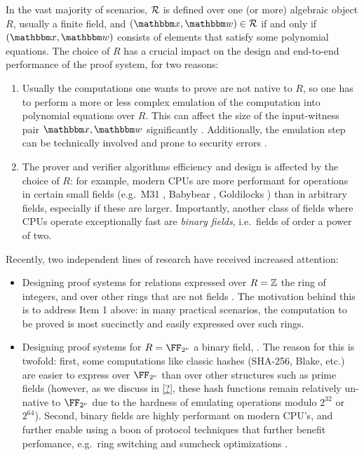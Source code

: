 \documentclass[11pt,letterpaper,usenames,dvipsnames]{article}
\begin{document}
In the vast majority of scenarios, $\mathcal{R}$ is defined over one (or more) algebraic object $R$, usually a finite field, and $(\inp,\wit)\in \Relation$ if and only if $(\inp,\wit)$ consists of elements that satisfy some polynomial equations. The choice of $R$ has a crucial impact on the design and end-to-end performance of the proof system, for two reasons: \begin{enumerate}[leftmargin=*]
\item Usually the computations one wants to prove are not native to $R$, so one has to perform a more or less complex emulation of the computation into polynomial equations over $R$. This can affect the size of the input-witness pair $\inp,\wit$ significantly \cite{??}. Additionally, the emulation step can be  technically involved and prone to  security errors \cite{??}.  
\item The prover and verifier algorithms efficiency and design is affected by the choice of $R$: for example, modern CPUs are more performant for operations in certain small fields (e.g.\ M31 \cite{?}, Babybear \cite{?}, Goldilocks \cite{?}) than in arbitrary fields, especially if these are larger. Importantly, another class of fields where CPUs operate exceptionally fast are \emph{binary fields}, i.e.\ fields of order a power of two.
%
\end{enumerate}
\noindent Recently, two independent lines of research have received increased attention:
\begin{itemize}[leftmargin=*]
    \item Designing proof systems for relations expressed over $R=\mathbb{Z}$ the ring of integers, and over other rings that are not fields \cite{zaratan,zinc,zincplus,qaren,limber,more}. The motivation behind this is to address Item 1 above: in many practical scenarios, the computation to be proved is most succinctly and easily expressed over such rings. 
    \item Designing proof systems for $R=\comfield$ a binary field, \cite{original_FRI_paper,binius,binius2,binius64,flock,more?}. The reason for this is twofold: first, some computations like classic hashes (SHA-256, Blake, etc.) are easier to express over  $\comfield$ than over other structures such as prime fields (however, as we discuss in \cref{?}, these hash functions remain relatively un-native to  $\comfield$ due to the hardness of emulating operations modulo $2^{32}$ or $2^{64}$). Second, binary fields are highly performant on modern CPU's, and further enable using a boon of protocol techniques that further benefit perfomance, e.g.\ ring switching \cite{binius,stark_people} and sumcheck optimizations \cite{yuval,more?}.
\end{itemize}
\end{document}
